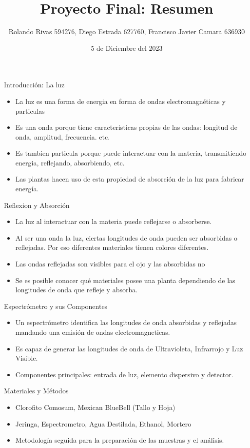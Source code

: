 \documentclass{beamer}
\title{Proyecto Final: Resumen}
\author{Rolando Rivas 594276, Diego Estrada 627760, Francisco Javier Camara 636930}
\date{5 de Diciembre del 2023}
\begin{document}
\frame{\titlepage}

\begin{frame}{Introducción: La luz}
    \begin{itemize}
        \item La luz es una forma de energia en forma de ondas electromagnéticas y particulas
        \item Es una onda porque tiene caracteristicas propias de las ondas: longitud de onda, amplitud, frecuencia. etc.
        \item Es tambien particula porque puede interactuar con la materia, transmitiendo energia, reflejando, absorbiendo, etc.
        \item Las plantas hacen uso de esta propiedad de absorción de la luz para fabricar energía.
    \end{itemize}
\end{frame}

\begin{frame}{Reflexion y Absorción}
    \begin{itemize}
        \item La luz al interactuar con la materia puede reflejarse o absorberse.
        \item Al ser una onda la luz, ciertas longitudes de onda pueden ser absorbidas o reflejadas. Por eso diferentes materiales tienen colores diferentes.
        \item Las ondas reflejadas son visibles para el ojo y las absorbidas no
        \item Se es posible conocer qué materiales posee una planta dependiendo de las longitudes de onda que refleje y absorba.
    \end{itemize}
\end{frame}

\begin{frame}{Espectrómetro y sus Componentes}
    \begin{itemize}
        \item Un espectrómetro identifica las longitudes de onda absorbidas y reflejadas mandando una emisión de ondas electromagneticas.
        \item   Es capaz de generar las longitudes de onda de Ultravioleta, Infrarrojo y Luz Visible. 
        \item Componentes principales: entrada de luz, elemento dispersivo y detector.
    \end{itemize}
\end{frame}

\begin{frame}{Materiales y Métodos}
    \begin{itemize}
        \item Clorofito Comosum, Mexican BlueBell (Tallo y Hoja)
        \item Jeringa,  Espectrometro, Agua Destilada, Ethanol, Mortero
        \item Metodología seguida para la preparación de las muestras y el análisis.
    \end{itemize}
\end{frame}
\end{document}
